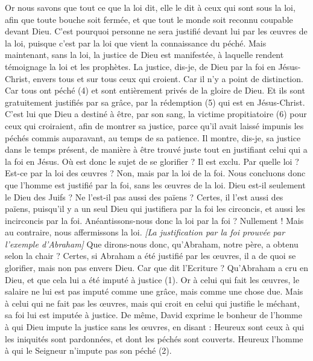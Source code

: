 \begin{multicols}{2}
Or nous savons que tout ce que la loi dit, elle le dit à ceux qui sont sous la loi, afin que toute bouche soit fermée, et que tout le monde soit reconnu coupable devant Dieu.
C'est pourquoi personne ne sera justifié devant lui par les œuvres de la loi, puisque c’est par la loi que vient la connaissance du péché.
Mais maintenant, sans la loi, la justice de Dieu est manifestée, à laquelle rendent témoignage la loi et les prophètes.
La justice, dis-je, de Dieu par la foi en Jésus-Christ, envers tous et sur tous ceux qui croient. Car il n'y a point de distinction.
Car tous ont péché (4) et sont entièrement privés de la gloire de Dieu.
Et ils sont gratuitement justifiés par sa grâce, par la rédemption (5) qui est en Jésus-Christ.
C’est lui que Dieu a destiné à être, par son sang, la victime propitiatoire (6) pour ceux qui croiraient, afin de montrer sa justice, parce qu’il avait laissé impunis les péchés commis auparavant, au temps de sa patience.
Il montre, dis-je, sa justice dans le temps présent, de manière à être trouvé juste tout en justifiant celui qui a la foi en Jésus.
Où est donc le sujet de se glorifier ? Il est exclu. Par quelle loi ? Est-ce par la loi des œuvres ? Non, mais par la loi de la foi.
Nous concluons donc que l'homme est justifié par la foi, sans les œuvres de la loi.
Dieu est-il seulement le Dieu des Juifs ? Ne l'est-il pas aussi des païens ? Certes, il l'est aussi des païens,
puisqu’il y a un seul Dieu qui justifiera par la foi les circoncis, et aussi les incirconcis par la foi.
Anéantissons-nous donc la loi par la foi ? Nullement ! Mais au contraire, nous affermissons la loi.
\textit{[La justification par la foi prouvée par l'exemple d'Abraham]}
\VerseOne{}Que dirons-nous donc, qu'Abraham, notre père, a obtenu selon la chair ?
Certes, si Abraham a été justifié par les œuvres, il a de quoi se glorifier, mais non pas envers Dieu.
Car que dit l'Ecriture ? Qu’Abraham a cru en Dieu, et que cela lui a été imputé à justice (1).
Or à celui qui fait les œuvres, le salaire ne lui est pas imputé comme une grâce, mais comme une chose due.
Mais à celui qui ne fait pas les œuvres, mais qui croit en celui qui justifie le méchant, sa foi lui est imputée à justice.
De même, David exprime le bonheur de l'homme à qui Dieu impute la justice sans les œuvres, en disant :
Heureux sont ceux à qui les iniquités sont pardonnées, et dont les péchés sont couverts.
Heureux l'homme à qui le Seigneur n’impute pas son péché (2).

\end{multicols}
